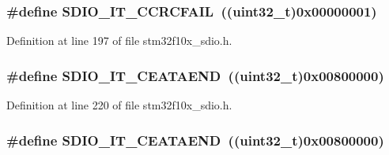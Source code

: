 \subsubsection[{\texorpdfstring{S\+D\+I\+O\+\_\+\+I\+T\+\_\+\+C\+C\+R\+C\+F\+A\+IL}{SDIO_IT_CCRCFAIL}}]{\setlength{\rightskip}{0pt plus 5cm}\#define S\+D\+I\+O\+\_\+\+I\+T\+\_\+\+C\+C\+R\+C\+F\+A\+IL~(({\bf uint32\+\_\+t})0x00000001)}\hypertarget{group___s_d_i_o___interrupt__sources_gabb076105e18355a260c40a379511e72f}{}\label{group___s_d_i_o___interrupt__sources_gabb076105e18355a260c40a379511e72f}


Definition at line 197 of file stm32f10x\+\_\+sdio.\+h.

\subsubsection[{\texorpdfstring{S\+D\+I\+O\+\_\+\+I\+T\+\_\+\+C\+E\+A\+T\+A\+E\+ND}{SDIO_IT_CEATAEND}}]{\setlength{\rightskip}{0pt plus 5cm}\#define S\+D\+I\+O\+\_\+\+I\+T\+\_\+\+C\+E\+A\+T\+A\+E\+ND~(({\bf uint32\+\_\+t})0x00800000)}\hypertarget{group___s_d_i_o___interrupt__sources_gae045cd5ba681d2df8b1031b8f659139a}{}\label{group___s_d_i_o___interrupt__sources_gae045cd5ba681d2df8b1031b8f659139a}


Definition at line 220 of file stm32f10x\+\_\+sdio.\+h.

\subsubsection[{\texorpdfstring{S\+D\+I\+O\+\_\+\+I\+T\+\_\+\+C\+E\+A\+T\+A\+E\+ND}{SDIO_IT_CEATAEND}}]{\setlength{\rightskip}{0pt plus 5cm}\#define S\+D\+I\+O\+\_\+\+I\+T\+\_\+\+C\+E\+A\+T\+A\+E\+ND~(({\bf uint32\+\_\+t})0x00800000)}\hypertarget{group___s_d_i_o___interrupt__sources_gae045cd5ba681d2df8b1031b8f659139a}{}\label{group___s_d_i_o___interrupt__sources_gae045cd5ba681d2df8b1031b8f659139a}


